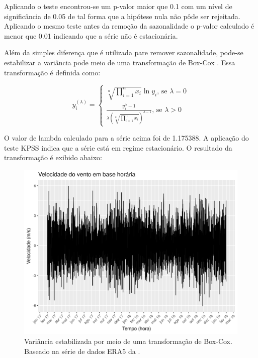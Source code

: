 \documentclass[
	12pt,				%
	openright,			%
	oneside,			%
	a4paper,			%
	english,			%
	french,				%
	spanish,			%
	brazil				%
	]{abntex2}
\begin{document}
Aplicando o teste encontrou-se um p-valor maior que 0.1 com um nível de significância de 0.05 de tal forma que a hipótese nula não pôde ser rejeitada. Aplicando o mesmo teste antes da remoção da sazonalidade o p-valor calculado é menor que 0.01 indicando que a série não é estacionária. 

Além da simples diferença que é utilizada pare remover sazonalidade, pode-se estabilizar a variância pode meio de uma transformação de Box-Cox \cite{boxcox}. Essa transformação é definida como:

\begin{equation}
y_i^{(\lambda)} = 
	\begin{cases}
		\sqrt[n]{\prod\limits_{i=1}^{n}x_i}\ln y_i\text{, se $\lambda = 0$}
		\\
		\frac{y_i^\lambda-1}{\lambda\left(\sqrt[n]{\prod\limits_{i=1}^{n}x_i}\right)^{\lambda-1}} \text{, se $\lambda > 0$}
	\end{cases}	
\end{equation}
 
O valor de lambda calculado para a série acima foi de 1.175388. A aplicação do teste KPSS indica que a série está em regime estacionário. O resultado da transformação é exibido abaixo:

\begin{figure}[h]
    \centering
	\includegraphics[width=\textwidth]{entire_series_hourly_basis_seasonless_boxcox.png}
	\caption{Variância estabilizada por meio de uma transformação de Box-Cox. Baseado na série de dados ERA5 da \cite{era5}.}
\end{figure}
\FloatBarrier 
\end{document}
